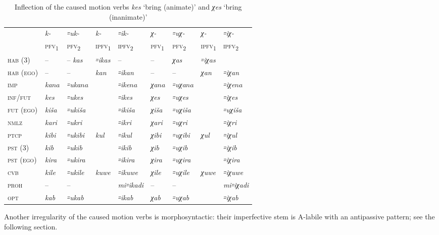 \documentclass[output=paper]{langsci/langscibook}
\begin{document}
\begin{table}[h]
\caption{Inflection of the caused motion verbs \emph{kes} `bring (animate)' and \emph{χes} `bring (inanimate)'}\label{tab:4:20}

\small
\advance\tabcolsep-1.2pt
\begin{tabular}{@{}lllllllll@{}}
\toprule
& \emph{k-} & \emph{꞊uk-} & \emph{k-} &
\emph{꞊ik-} & \emph{χ-} & \emph{꞊uχ-} &
\emph{χ-} & \emph{꞊iχ-}\tabularnewline
& \textsc{pfv}\textsubscript{1} & \textsc{pfv}\textsubscript{2} & \textsc{ipfv}\textsubscript{1} &
\textsc{ipfv}\textsubscript{2} & \textsc{pfv}\textsubscript{1} & \textsc{pfv}\textsubscript{2} &
\textsc{ipfv}\textsubscript{1} & \textsc{ipfv}\textsubscript{2}\tabularnewline\midrule
\textsc{hab} (3) & – & – \emph{kas} & \emph{꞊ikas} & – & – & \emph{χas} & \emph{꞊iχas} \tabularnewline
\textsc{hab (ego)} &  – &  – &  \emph{kan} & \emph{꞊ikan} & – & – & \emph{χan} & \emph{꞊iχan}\tabularnewline
\textsc{imp} & \emph{ka\(na\)} & \emph{꞊uka\(na\)} & & \emph{꞊ike\(na\)} &
\emph{χa\(na\)} & \emph{꞊uχa\(na\)} & & \emph{꞊iχe\(na\)}\tabularnewline
\textsc{inf}/\textsc{fut} & \emph{kes} & \emph{꞊ukes} & & \emph{꞊ikes} & \emph{χes} &
\emph{꞊uχes} & & \emph{꞊iχes}\tabularnewline
\textsc{fut (ego)} & 
\emph{kiša} & 
\emph{꞊ukiša} & 
 & 
\emph{꞊ikiša} & 
\emph{χiša} & 
\emph{꞊uχiša} & 
 & 
\emph{꞊uχiša}\tabularnewline
\textsc{nmlz} & \emph{kari} & \emph{꞊ukri} & & \emph{꞊ikri} & \emph{χari} &
\emph{꞊uχri} & & \emph{꞊iχri}\tabularnewline
\textsc{ptcp} & \emph{kibi} & \emph{꞊ukibi} & \emph{kul} & \emph{꞊ikul} &
\emph{χibi} & \emph{꞊uχibi} & \emph{χul} & \emph{꞊iχul}\tabularnewline
\textsc{pst} (3) & \emph{kib} & \emph{꞊ukib} & & \emph{꞊ikib} & \emph{χib} & \emph{꞊uχib} & & \emph{꞊iχib} \tabularnewline
\textsc{pst (ego)} &  \emph{kira} & \emph{꞊ukira} &   & \emph{꞊ikira} & \emph{χira} &  \emph{꞊uχira} &  & \emph{꞊iχira}\tabularnewline
\textsc{cvb} & \emph{kile} & \emph{꞊ukile} & \emph{kuwe} & \emph{꞊ikuwe} &
\emph{χile} & \emph{꞊uχile} & \emph{χuwe} & \emph{꞊iχuwe}\tabularnewline
\textsc{proh} & – & – & & \emph{mi꞊ikadi} & – & – & &
\emph{mi꞊iχadi}\tabularnewline
\textsc{opt} & \emph{kab} & \emph{꞊ukab} & & \emph{꞊ikab} & \emph{χab} &
\emph{꞊uχab} & & \emph{꞊iχab}\tabularnewline
\bottomrule
\end{tabular}
\end{table}

Another irregularity of the caused motion verbs is morphosyntactic:
their imperfective stem is A-labile with an antipassive pattern; see the
following section.
{\par}
\end{document}
